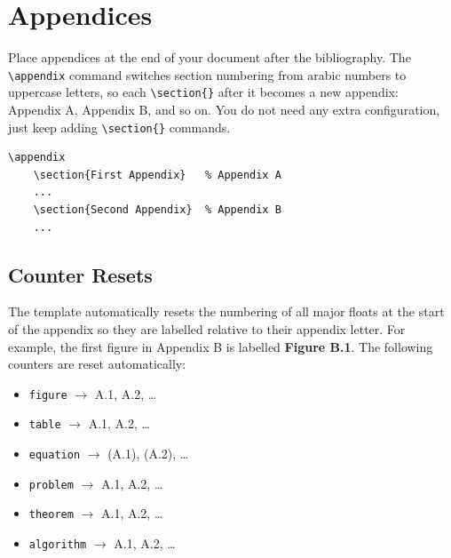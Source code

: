 \newpage
\section{Appendices}\label{sec:appendix-supp}

Place appendices at the end of your document after the bibliography. The \texttt{\textbackslash appendix} command switches section numbering from arabic numbers to uppercase letters, so each \texttt{\textbackslash section\{\}} after it becomes a new appendix: Appendix A, Appendix B, and so on. You do not need any extra configuration, just keep adding \texttt{\textbackslash section\{\}} commands.

\begin{lstlisting}[style=latex,
	caption={Appendix Section Code.}]
	\appendix
	\section{First Appendix}   % Appendix A
	...
	\section{Second Appendix}  % Appendix B
	...
\end{lstlisting}

\subsection{Counter Resets}
The template automatically resets the numbering of all major floats at the start of the appendix so they are labelled relative to their appendix letter. For example, the first figure in Appendix B is labelled \textbf{Figure B.1}. The following counters are reset automatically:

\begin{itemize}[noitemsep]
	\item \texttt{figure} $\rightarrow$ A.1, A.2, \ldots
	\item \texttt{table} $\rightarrow$ A.1, A.2, \ldots
	\item \texttt{equation} $\rightarrow$ (A.1), (A.2), \ldots
	\item \texttt{problem} $\rightarrow$ A.1, A.2, \ldots
	\item \texttt{theorem} $\rightarrow$ A.1, A.2, \ldots
	\item \texttt{algorithm} $\rightarrow$ A.1, A.2, \ldots
\end{itemize}

